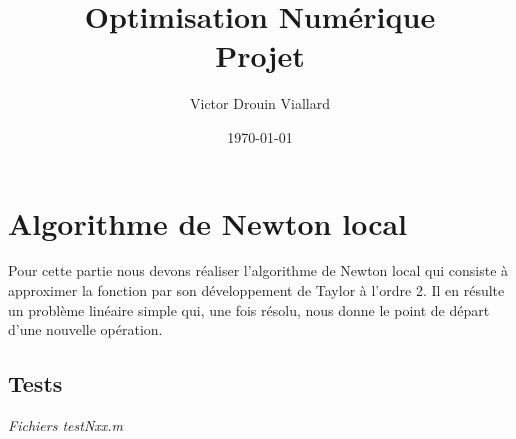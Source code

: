 \documentclass[12pt]{article}	%
\title{Optimisation Numérique\\Projet}
\author{Victor Drouin Viallard}
\date{\today}
\begin{document}
\maketitle
\newpage

\tableofcontents
\newpage

\section{Algorithme de Newton local}
Pour cette partie nous devons réaliser l'algorithme de Newton local qui consiste à approximer la fonction par son développement de Taylor à l'ordre 2. Il en résulte un problème linéaire simple qui, une fois résolu, nous donne le point de départ d'une nouvelle opération.

\subsection{Tests}
\begin{flushright}
\textit{Fichiers testNxx.m}
\end{flushright}
\end{document}
